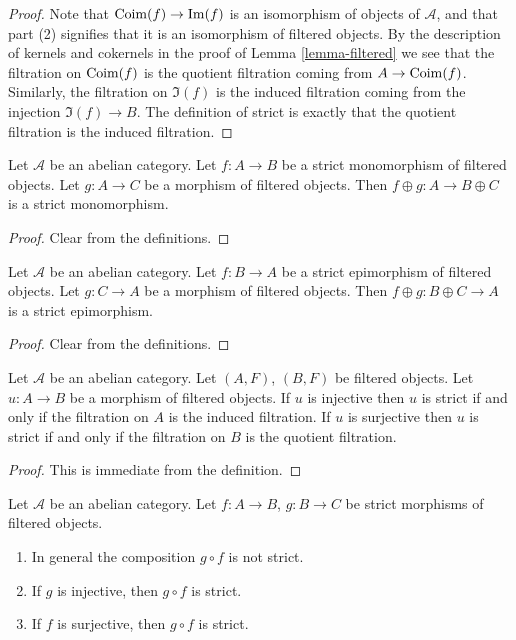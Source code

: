 \begin{proof}
Note that $\mathop{\mathrm{Coim}}(f) \to \mathop{\mathrm{Im}}(f)$ is an isomorphism of
objects of $\mathcal{A}$, and that part (2) signifies that it is
an isomorphism of filtered objects.
By the description of kernels and cokernels in the proof of
Lemma \ref{lemma-filtered}
we see that the filtration on $\mathop{\mathrm{Coim}}(f)$ is the
quotient filtration coming from $A \to \mathop{\mathrm{Coim}}(f)$.
Similarly, the filtration on $\Im(f)$ is the induced
filtration coming from the injection $\Im(f) \to B$.
The definition of strict is exactly that the quotient filtration
is the induced filtration.
\end{proof}

\begin{lemma}
\label{lemma-add-summand-strict-monomorphism}
Let $\mathcal{A}$ be an abelian category.
Let $f : A \to B$ be a strict monomorphism of filtered objects.
Let $g : A \to C$ be a morphism of filtered objects.
Then $f \oplus g : A \to B \oplus C$ is a strict monomorphism.
\end{lemma}

\begin{proof}
Clear from the definitions.
\end{proof}

\begin{lemma}
\label{lemma-add-summand-strict-epimorphism}
Let $\mathcal{A}$ be an abelian category.
Let $f : B \to A$ be a strict epimorphism of filtered objects.
Let $g : C \to A$ be a morphism of filtered objects.
Then $f \oplus g : B \oplus C \to A$ is a strict epimorphism.
\end{lemma}

\begin{proof}
Clear from the definitions.
\end{proof}

\begin{lemma}
\label{lemma-induced-and-quotient-strict}
Let $\mathcal{A}$ be an abelian category.
Let $(A, F)$, $(B, F)$ be filtered objects.
Let $u : A \to B$ be a morphism of filtered objects.
If $u$ is injective then $u$ is strict if and only if the filtration
on $A$ is the induced filtration.
If $u$ is surjective then $u$ is strict if and only if the filtration
on $B$ is the quotient filtration.
\end{lemma}

\begin{proof}
This is immediate from the definition.
\end{proof}

\begin{lemma}
\label{lemma-composition-strict}
Let $\mathcal{A}$ be an abelian category. Let $f : A \to B$, $g : B \to C$
be strict morphisms of filtered objects.
\begin{enumerate}
\item In general the composition $g \circ f$ is not strict.
\item If $g$ is injective, then $g \circ f$ is strict.
\item If $f$ is surjective, then $g \circ f$ is strict.
\end{enumerate}
\end{lemma}

